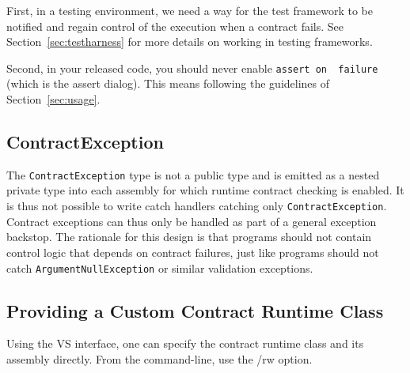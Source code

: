 \documentclass{article}
\newcommand{\code}[1]{\lstinline{#1}}
\begin{document}
First, in a testing environment, we need a way for the test framework
to be notified and regain control of the execution when a contract
fails. See Section~\ref{sec:testharness} for more details on
working in testing frameworks.

Second, in your released code, you should never enable \code{assert on
 failure} (which is the assert dialog). This means following
the guidelines of Section~\ref{sec:usage}.

\subsection{ContractException}

The \code{ContractException} type is not a public type and is emitted
as a nested private type into each assembly for which runtime contract
checking is enabled. It is thus not possible to write catch
handlers catching only \code{ContractException}. Contract exceptions
can thus only be handled as part of a general exception backstop. The
rationale for this design is that programs should not contain control
logic that depends on contract failures, just like programs should not
catch \code{ArgumentNullException} or similar validation exceptions.

\subsection{Providing a Custom Contract Runtime Class}
\label{sec:customrewritermethods}

Using the VS interface, one can specify the contract runtime
class and its assembly directly. From the command-line, use the /rw
option.
\end{document}
